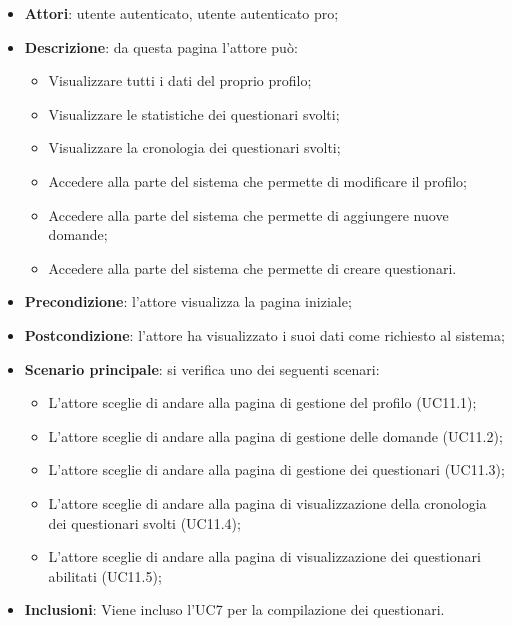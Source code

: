 \begin{itemize}
\item\textbf{Attori}: utente autenticato, utente autenticato pro;
\item\textbf{Descrizione}: da questa pagina l'attore può: 
\begin{itemize}
	\item Visualizzare tutti i dati del proprio profilo;
	\item Visualizzare le statistiche dei questionari svolti;
	\item Visualizzare la cronologia dei questionari svolti;
	\item Accedere alla parte del sistema che permette di modificare il profilo;
	\item Accedere alla parte del sistema che permette di aggiungere nuove domande;
	\item Accedere alla parte del sistema che permette di creare questionari.
\end{itemize}
\item\textbf{Precondizione}: l'attore visualizza la pagina iniziale;
\item\textbf{Postcondizione}: l'attore ha visualizzato i suoi dati come richiesto al sistema;
\item\textbf{Scenario principale}: si verifica uno dei seguenti scenari:
\begin{itemize}
\item L'attore sceglie di andare alla pagina di gestione del profilo (UC11.1);
\item L'attore sceglie di andare alla pagina di gestione delle domande (UC11.2);  
\item L'attore sceglie di andare alla pagina di gestione dei questionari (UC11.3);
\item L'attore sceglie di andare alla pagina di visualizzazione della cronologia dei questionari svolti (UC11.4);
\item L'attore sceglie di andare alla pagina di visualizzazione dei questionari abilitati (UC11.5);
\end{itemize}
\item\textbf{Inclusioni}: Viene incluso l'UC7 per la compilazione dei questionari.
\end{itemize}

